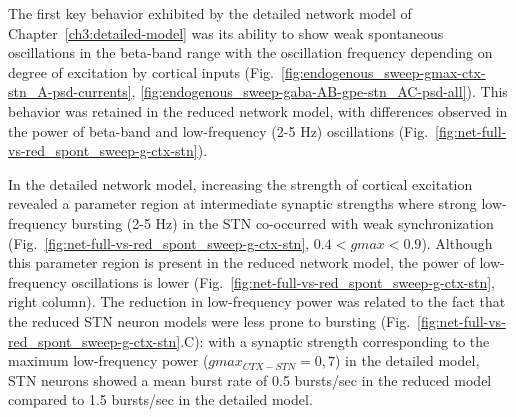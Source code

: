 %
%

%
%
%
%
The first key behavior exhibited by the detailed network model of Chapter~\ref{ch3:detailed-model}
was its ability to show weak spontaneous oscillations in the beta-band range with the
oscillation frequency depending on degree of excitation by cortical inputs
(Fig.~\ref{fig:endogenous_sweep-gmax-ctx-stn_A-psd-currents}, \ref{fig:endogenous_sweep-gaba-AB-gpe-stn_AC-psd-all}).
This behavior was retained in the reduced network model, with differences observed
in the power of beta-band and low-frequency (2-5 Hz) oscillations
(Fig.~\ref{fig:net-full-vs-red_spont_sweep-g-ctx-stn}).

In the detailed network model, increasing the strength of cortical excitation
revealed a parameter region at intermediate synaptic strengths where strong
low-frequency bursting (2-5 Hz) in the STN co-occurred with weak synchronization
(Fig.~\ref{fig:net-full-vs-red_spont_sweep-g-ctx-stn}, $ 0.4 < gmax < 0.9 $).
Although this parameter region is present in the reduced network model,
the power of low-frequency oscillations is lower (Fig.~\ref{fig:net-full-vs-red_spont_sweep-g-ctx-stn},
right column). The reduction in low-frequency power was related to the fact
that the reduced STN neuron models were less prone to bursting
(Fig.~\ref{fig:net-full-vs-red_spont_sweep-g-ctx-stn}.C): with a synaptic
strength corresponding to the maximum low-frequency power ($gmax_{CTX-STN} = 0,7$)
in the detailed model, STN neurons showed a mean burst rate of 0.5 bursts/sec
in the reduced model compared to 1.5 bursts/sec in the detailed model.
%

